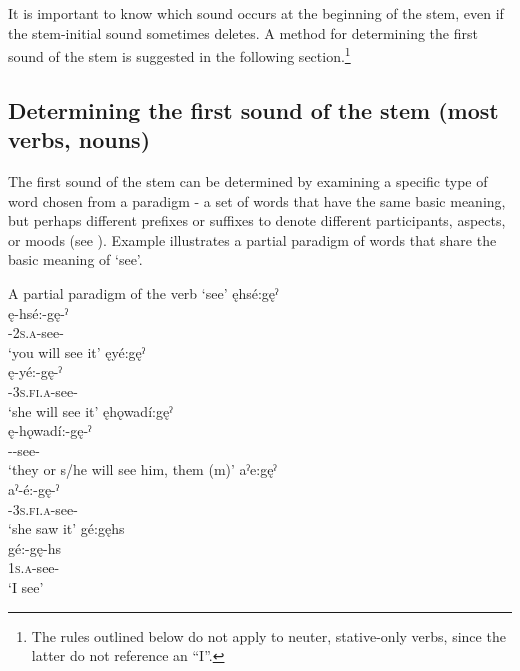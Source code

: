 It is important to know which sound occurs at the beginning of the stem, even if the stem-initial sound sometimes deletes. A method for determining the first sound of the stem is suggested in the following section.\footnote{The rules outlined below do not apply to neuter, stative-only verbs, since the latter do not reference an “I”.}


\subsection{Determining the first sound of the stem (most verbs, nouns)} \label{(most verbs, nouns)}
The first sound of the stem can be determined by examining a specific type of word chosen from a paradigm - a set of words that have the same basic meaning, but perhaps different prefixes or suffixes to denote different participants, aspects, or moods (see ). Example  illustrates a partial paradigm of words that share the basic meaning of ‘see’. 

\ea\label{ex:paradigmexample} A partial paradigm of the verb  ‘see’
\ea ęhsé:gęˀ\\\label{ex:paradigmexamplea}
\gll ę-hsé:-gę-ˀ\\
 \fut-\textsc{2s.a}-see-{\punctual}\\
\glt `you will see it'
\ex ęyé:gęˀ\\\label{ex:paradigmexampleb}
\gll ę-yé:-gę-ˀ\\
 \fut-\textsc{3s.fi.a}-see-{\punctual}\\
\glt `she will see it'
\ex ęhǫwadí:gęˀ\\\label{ex:paradigmexamplec}
\gll ę-hǫwadí:-gę-ˀ\\
 \fut--see-{\punctual}\\
\glt `they or s/he will see him, them (m)'
\ex aˀe:gęˀ\\\label{ex:paradigmexampled}
\gll aˀ-é:-gę-ˀ\\
 {\factual}-\textsc{3s.fi.a}-see-{\punctual}\\
\glt `she saw it'
\ex gé:gęhs\\\label{ex:paradigmexamplee}
\gll gé:-gę-hs\\
 \textsc{1s.a}-see-{\habitual}\\
\glt `I see'
\z
\z



